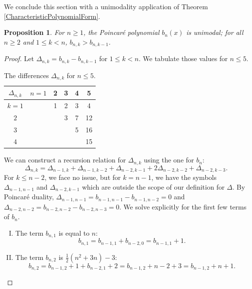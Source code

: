\documentclass[12pt]{amsart}
\newtheorem{prop}[theorem]{Proposition}
\theoremstyle{definition}
\begin{document}
We conclude this section with a unimodality application of Theorem \ref{CharacteristicPolynomialForm}.

\begin{prop}\label{prop:38}
    For $n \geq 1$, the Poincar\'e polynomial $b_n(x)$ is unimodal; for all $n\ge 2$ and $1\le  k < n$, $b_{n,k}>b_{n,k-1}$. 
\end{prop}

\begin{proof}Let $\Delta_{n,k}= b_{n,k} - b_{n,k-1}$ for $1\leq k<n$. We tabulate those values for $n \leq 5$.
    \begin{table}[H]
        \centering
        \begin{tabular}{|c|c|c|c|c|c|}
        \hline
             $\Delta_{n,k}$& $n=1$ & 2 & 3 & 4 & 5 \\
             \hline
             $k=1$         &       & 1 & 2 & 3 & 4 \\
             \hline
             $2$           &       &   & 3 & 7 & 12\\
             \hline
             $3$           &       &   &   & 5 & 16\\
             \hline
             $4$           &       &   &   &   & 15\\
             \hline
        \end{tabular}  
        \caption{The differences $\Delta_{n,k}$ for $n \leq 5$.}
    \end{table}
    We can construct a recursion relation for $\Delta_{n,k}$ using the one for $b_n$: \[\Delta_{n,k} = \Delta_{n-1,k} + \Delta_{n-1,k-2} + \Delta_{n-2,k-1}+2\Delta_{n-2,k-2} + \Delta_{n-2,k-3}. \] For $k\leq n-2$, we face no issue, but for $k=n-1$, we have the symbols $\Delta_{n-1,n-1}$ and $\Delta_{n-2,k-1}$ which are outside the scope of our definition for $\Delta$. By Poincar\'e duality, $\Delta_{n-1,n-1} = b_{n-1,n-1} - b_{n-1,n-2} = 0$ and $\Delta_{n-2,n-2} = b_{n-2,n-2} - b_{n-2,n-3} = 0$. We solve explicitly for the first few terms of $b_n$. 
    \begin{enumerate}[(I)]
        \item The term $b_{n,1}$ is equal to $n$: \[ b_{n,1} = b_{n-1,1} + b_{n-2,0} = b_{n-1,1}+1.\]
        \item The term $b_{n,2}$ is $ \frac{1}{2}(n^2 +3n) - 3$: \[b_{n,2} = b_{n-1,2} + 1 +b_{n-2,1} + 2 = b_{n-1,2}+ n-2 + 3 = b_{n-1,2} + n+1.\]
        

\end{enumerate}
\end{proof}
\end{document}
